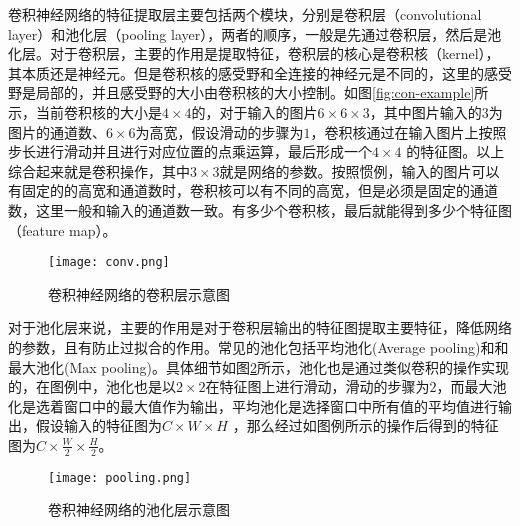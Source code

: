 卷积神经网络的特征提取层主要包括两个模块，分别是卷积层（convolutional layer）和池化层（pooling layer），两者的顺序，一般是先通过卷积层，然后是池化层。对于卷积层，主要的作用是提取特征，卷积层的核心是卷积核（kernel），其本质还是神经元。但是卷积核的感受野和全连接的神经元是不同的，这里的感受野是局部的，并且感受野的大小由卷积核的大小控制。如图\ref{fig:con-example}所示，当前卷积核的大小是$4 \times 4$的，对于输入的图片$6 \times 6 \times 3$，其中图片输入的3为图片的通道数、$6 \times 6$为高宽，假设滑动的步骤为$1$，卷积核通过在输入图片上按照步长进行滑动并且进行对应位置的点乘运算，最后形成一个$4 \times 4$ 的特征图。以上综合起来就是卷积操作，其中$3 \times 3$就是网络的参数。按照惯例，输入的图片可以有固定的的高宽和通道数时，卷积核可以有不同的高宽，但是必须是固定的通道数，这里一般和输入的通道数一致。有多少个卷积核，最后就能得到多少个特征图（feature map）。
\begin{figure}[htpb]
	\centering
	\texttt{[image: conv.png]}
    \caption{卷积神经网络的卷积层示意图}
	\vspace*{-3.5mm}
	\label{fig:conv-example}
\end{figure}

对于池化层来说，主要的作用是对于卷积层输出的特征图提取主要特征，降低网络的参数，且有防止过拟合的作用。常见的池化包括平均池化(Average pooling)和和最大池化(Max pooling)。具体细节如图\ref{fig:pooling-example}所示，池化也是通过类似卷积的操作实现的，在图例中，池化也是以$2 \times 2$在特征图上进行滑动，滑动的步骤为$2$，而最大池化是选着窗口中的最大值作为输出，平均池化是选择窗口中所有值的平均值进行输出，假设输入的特征图为$C \times W \times H$ ，那么经过如图例所示的操作后得到的特征图为$C \times \frac{W}{2} \times \frac{H}{2}$。
\begin{figure}[htpb]
	\centering
	\texttt{[image: pooling.png]}
    \caption{卷积神经网络的池化层示意图}
	\vspace*{-3.5mm}
	\label{fig:pooling-example}
\end{figure}

